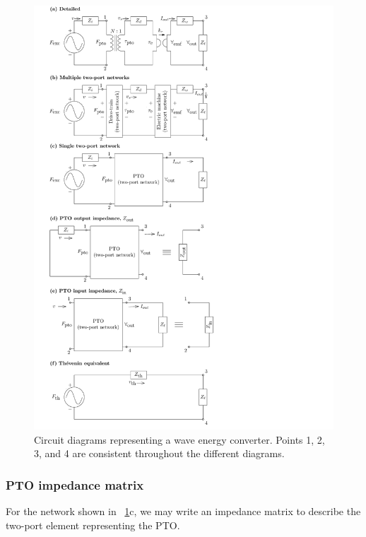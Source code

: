 \documentclass[lettersize,journal]{IEEEtran}
\begin{document}
\begin{figure}[tb]
        \centering
        \includegraphics[width=1\columnwidth]{wec_as_multiport_circuits.pdf}
        \caption{Circuit diagrams representing a wave energy converter. Points 1, 2, 3, and 4 are consistent throughout the different diagrams.}
        \label{fig:wec_as_multiport_circuits}
\end{figure}

\subsubsection{PTO impedance matrix}\label{sec:pto_impedance_matrix}

For the network shown in \figurename~\ref{fig:wec_as_multiport_circuits}c, we may write an impedance matrix to describe the two-port element representing the PTO.
\end{document}
